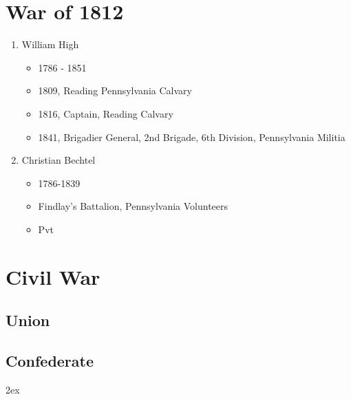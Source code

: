 \documentclass[11pt,letter]{book}
\begin{document}
\chapter{War of 1812}

\begin{enumerate}
\item William High
\begin{itemize}
\item 1786 - 1851
\item 1809, Reading Pennsylvania Calvary 
\item 1816, Captain, Reading Calvary 
\item 1841, Brigadier General, 2nd Brigade, 6th Division, Pennsylvania Militia 
\end{itemize}

\item Christian Bechtel
\begin{itemize}
\item 1786-1839
\item Findlay's Battalion, Pennsylvania Volunteers 
\item Pvt
\end{itemize}
\end{enumerate}


\chapter{Civil War}

\section{Union}



\section{Confederate}





\newpage
\begingroup
\parindent 0pt
\parskip 2ex
\def\enotesize{\normalsize}
\theendnotes
\endgroup
\end{document}

